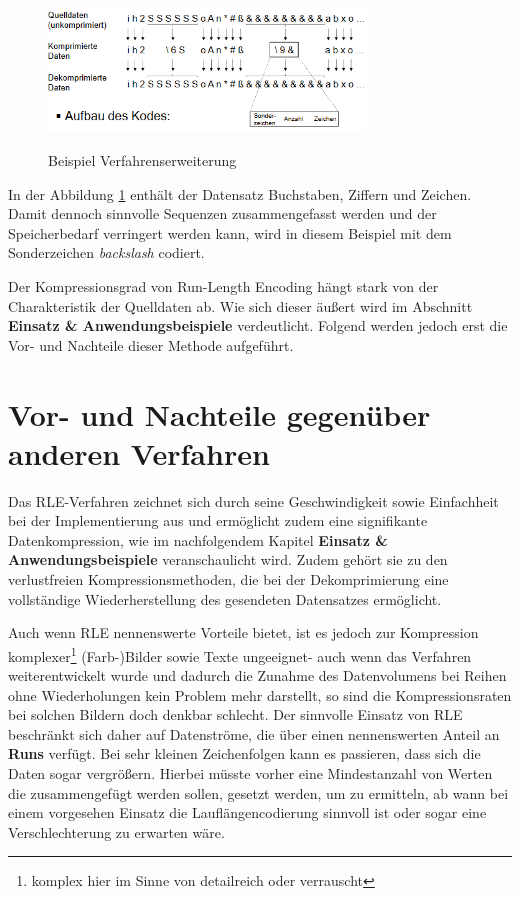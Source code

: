 \documentclass[11pt,a4paper,ngerman]{report}
\begin{document}
  		   \begin{figure} [H]
  		  	\begin{center}
  		  		\includegraphics[width=0.75\textwidth]{alpha_ziffer.png}
  		  		\caption{Beispiel Verfahrenserweiterung}
  		  		\cite[Seite 62]{Lange2021}
  		  		\label{Lange}
  		  	\end{center}
  		  \end{figure}
  		  
  		  In der Abbildung \ref{Lange} enthält der Datensatz Buchstaben, Ziffern und  Zeichen. Damit dennoch sinnvolle Sequenzen zusammengefasst werden und der Speicherbedarf verringert werden kann, wird in diesem Beispiel mit dem Sonderzeichen \textit{backslash} codiert.
  		  
  		  Der Kompressionsgrad von Run-Length Encoding hängt stark von der Charakteristik der Quelldaten ab. \cite[Seite 62]{Lange2021} Wie sich dieser äußert wird im Abschnitt  \textbf{Einsatz \& Anwendungsbeispiele} verdeutlicht. Folgend werden jedoch erst die  Vor- und Nachteile dieser Methode aufgeführt.
  		 
  		 
  		 
	
		\section{Vor- und Nachteile gegenüber anderen Verfahren}
		
		Das RLE-Verfahren zeichnet sich durch seine Geschwindigkeit sowie Einfachheit bei der Implementierung aus und ermöglicht zudem  eine signifikante Datenkompression, wie im nachfolgendem Kapitel \textbf{Einsatz \& Anwendungsbeispiele} veranschaulicht wird. Zudem gehört sie zu den verlustfreien Kompressionsmethoden, die bei der Dekomprimierung eine vollständige Wiederherstellung des gesendeten Datensatzes ermöglicht.

		Auch wenn RLE nennenswerte Vorteile bietet, ist es jedoch zur Kompression komplexer\footnote{komplex hier im Sinne von detailreich oder verrauscht} (Farb-)Bilder sowie Texte ungeeignet- auch wenn das Verfahren weiterentwickelt wurde und dadurch die Zunahme des Datenvolumens bei Reihen ohne Wiederholungen kein Problem mehr darstellt, so sind die Kompressionsraten bei solchen Bildern doch denkbar schlecht. \cite{Koeck2006} Der sinnvolle Einsatz von RLE beschränkt sich daher auf Datenströme, die über einen nennenswerten Anteil an \textbf{Runs} verfügt.	Bei sehr kleinen Zeichenfolgen kann es passieren, dass sich die Daten sogar vergrößern. Hierbei müsste vorher eine Mindestanzahl von Werten die zusammengefügt werden sollen, gesetzt werden, um zu ermitteln, ab wann  bei einem vorgesehen Einsatz die Lauflängencodierung sinnvoll ist oder sogar eine Verschlechterung zu erwarten wäre.
		
\end{document}
